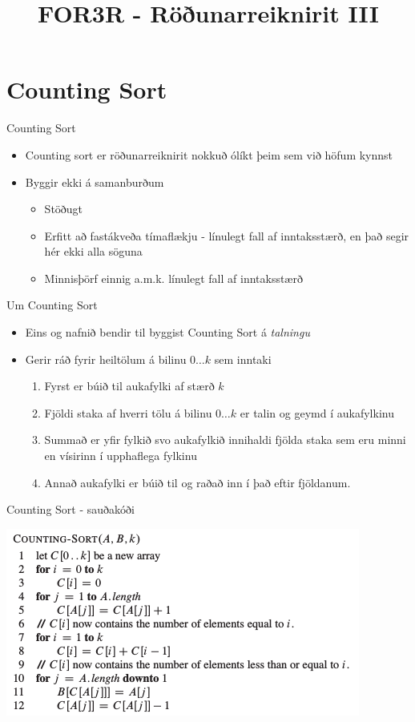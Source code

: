 \documentclass{beamer}
\title{FOR3R - Röðunarreiknirit III}
\begin{document}
\begin{frame}
\titlepage
\end{frame}

\section{Counting Sort}

\begin{frame}{Counting Sort}

\begin{itemize}
 \item Counting sort er röðunarreiknirit nokkuð ólíkt þeim sem við höfum kynnst
 \item Byggir ekki á samanburðum
  \begin{itemize}
  \item Stöðugt
  \item Erfitt að fastákveða tímaflækju - línulegt fall af inntaksstærð, en það segir hér ekki alla söguna
  \item Minnisþörf einnig a.m.k. línulegt fall af inntaksstærð
  \end{itemize}
\end{itemize}
\end{frame}

\begin{frame}{Um Counting Sort}
\begin{itemize}
 \item Eins og nafnið bendir til byggist Counting Sort á \emph{talningu}
 \item Gerir ráð fyrir heiltölum á bilinu $0 \ldots k$ sem inntaki
 \begin{enumerate}
  \item Fyrst er búið til aukafylki af stærð $k$
  \item Fjöldi staka af hverri tölu á bilinu $0 \ldots k$ er talin og geymd í aukafylkinu
  \item Summað er yfir fylkið svo aukafylkið innihaldi fjölda staka sem eru minni en vísirinn í upphaflega fylkinu
  \item Annað aukafylki er búið til og raðað inn í það eftir fjöldanum.
 \end{enumerate}
\end{itemize}
\end{frame}

\begin{frame}[fragile]{Counting Sort - sauðakóði}
\begin{center}
\includegraphics[scale=0.8]{Pics/counting-sort-pseudocode}
\end{center}
\end{frame}
\end{document}

